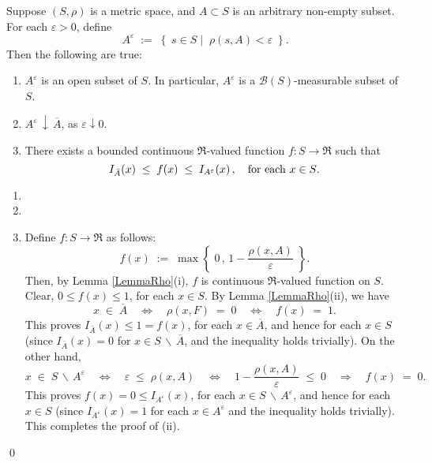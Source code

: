 \begin{lemma}
\label{LemmaAEpsilon}
\quad
Suppose $\left(S,\rho\right)$ is a metric space, and $A \subset S$ is an arbitrary non-empty subset.
For each $\varepsilon > 0$, define
\begin{equation*}
A^{\varepsilon} \;:=\;
\left\{\;
s \in S
\;\left\vert\;\;
\rho(s,A) < \varepsilon
\right.
\;\right\}.
\end{equation*}
Then the following are true:
\begin{enumerate}
\item
	$A^{\varepsilon}$ is an open subset of $S$. In particular, $A^{\varepsilon}$ is a $\mathcal{B}(S)$-measurable subset of $S$.
\item
	$A^{\varepsilon}\,\downarrow\,\overline{A}$, as $\varepsilon \downarrow 0$.
\item
	There exists a bounded continuous $\Re$-valued function $f : S \longrightarrow \Re$
	such that
	\begin{equation*}
	I_{\bar{A}}(x) \;\leq\; f(x) \;\leq\; I_{A^{\varepsilon}}(x)\,,
	\quad\textnormal{for each $x \in S$}.
	\end{equation*}
\end{enumerate}	
\end{lemma}
\proof
\begin{enumerate}
\item
\item
\item
	Define $f : S \longrightarrow \Re$ as follows:
	\begin{equation*}
	f(x) \; := \;
	\max\left\{\;
	0\,,\,
	1 - \dfrac{\rho(x,A)}{\varepsilon}
	\;\right\}.
	\end{equation*}
	Then, by Lemma \ref{LemmaRho}(i), $f$ is continuous $\Re$-valued function on $S$.
	Clear, $0 \leq f(x) \leq 1$, for each $x \in S$.
	By Lemma \ref{LemmaRho}(ii), we have
	\begin{equation*}
	x \;\in\; \overline{A}
	\quad\Longleftrightarrow\quad
	\rho(x,F) \;=\; 0
	\quad\Longleftrightarrow\quad
	f(x) \; = \; 1.
	\end{equation*}
	This proves $I_{\bar{A}}(x) \leq 1 = f(x)$, for each $x \in \overline{A}$, and hence for each $x \in S$
	(since $I_{\bar{A}}(x) = 0$ for $x \in S\,\backslash\,\overline{A}$, and the inequality holds trivially).
	On the other hand,
	\begin{equation*}
	x \;\in\; S\,\backslash\,A^{\varepsilon}
	\quad\Longleftrightarrow\quad
	\varepsilon \;\leq\; \rho(x,A)
	\quad\Longleftrightarrow\quad
	1 - \dfrac{\rho(x,A)}{\varepsilon} \;\leq\; 0
	\quad\Longrightarrow\quad
	f(x) \;=\; 0.
	\end{equation*}
	This proves $f(x) = 0 \leq I_{A^{\varepsilon}}(x)$, for each $x \in S\,\backslash\,A^{\varepsilon}$,
	and hence for each $x \in S$ (since $I_{A^{\varepsilon}}(x) = 1$ for each $x \in A^{\varepsilon}$
	and the inequality holds trivially).
	This completes the proof of (ii).
\end{enumerate}
\qed

